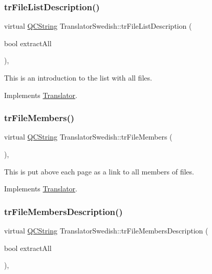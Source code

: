 \subsubsection{\texorpdfstring{trFileListDescription()}{trFileListDescription()}}
{\footnotesize\ttfamily virtual \mbox{\hyperlink{class_q_c_string}{Q\+C\+String}} Translator\+Swedish\+::tr\+File\+List\+Description (\begin{DoxyParamCaption}\item[{bool}]{extract\+All }\end{DoxyParamCaption})\hspace{0.3cm}{\ttfamily [inline]}, {\ttfamily [virtual]}}

This is an introduction to the list with all files. 

Implements \mbox{\hyperlink{class_translator}{Translator}}.

\mbox{\label{class_translator_swedish_a27ca923f4da8a36ef19bbff311743cb2}} 
\subsubsection{\texorpdfstring{trFileMembers()}{trFileMembers()}}
{\footnotesize\ttfamily virtual \mbox{\hyperlink{class_q_c_string}{Q\+C\+String}} Translator\+Swedish\+::tr\+File\+Members (\begin{DoxyParamCaption}{ }\end{DoxyParamCaption})\hspace{0.3cm}{\ttfamily [inline]}, {\ttfamily [virtual]}}

This is put above each page as a link to all members of files. 

Implements \mbox{\hyperlink{class_translator}{Translator}}.

\mbox{\label{class_translator_swedish_a65e2378608a1321ff8741567a7326359}} 
\subsubsection{\texorpdfstring{trFileMembersDescription()}{trFileMembersDescription()}}
{\footnotesize\ttfamily virtual \mbox{\hyperlink{class_q_c_string}{Q\+C\+String}} Translator\+Swedish\+::tr\+File\+Members\+Description (\begin{DoxyParamCaption}\item[{bool}]{extract\+All }\end{DoxyParamCaption})\hspace{0.3cm}{\ttfamily [inline]}, {\ttfamily [virtual]}}

